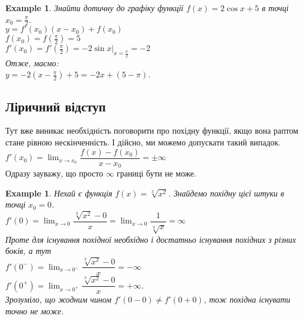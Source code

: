 \documentclass[a4paper, 14pt]{article}
\theoremstyle{theoremdd}
\theoremstyle{theoremdd}
\theoremstyle{theoremdd}
\theoremstyle{theoremdd}
\newtheorem{example}[theorem]{Example}
\theoremstyle{theoremdd}
\theoremstyle{theoremdd}
\theoremstyle{theoremdd}
\theoremstyle{theoremdd}
\begin{document}
\begin{example}
Знайти дотичну до графіку функції $f(x) = 2 \cos x + 5$ в точці $x_0 = \displaystyle \frac{\pi}{2}$.\\
$y = f'(x_0)(x-x_0)+f(x_0)$\\
$f(x_0) = \displaystyle f(\frac{\pi}{2}) = 5$\\
$f'(x_0) = \displaystyle f'(\frac{\pi}{2}) = -2 \sin x |_{x = \frac{\pi}{2}} = -2$\\
Отже, маємо:\\
$y = \displaystyle -2(x-\frac{\pi}{2}) + 5 = -2x + (5 - \pi)$.
\end{example}

\subsection*{Ліричний відступ}
Тут вже виникає необхідність поговорити про похідну функції, якщо вона раптом стане рівною нескінченність. І дійсно, ми можемо допускати такий випадок.\\
$f'(x_0) = \displaystyle \lim_{x \to x_0} \dfrac{f(x)-f(x_0)}{x-x_0} = \pm \infty$\\
Одразу зауважу, що просто $\infty$ границі бути не може.

\begin{example}
Нехай є функція $f(x) = \sqrt[3]{x^2}$. Знайдемо похідну цієї штуки в точці $x_0 = 0$.\\
$f'(0) = \displaystyle \lim_{x \to 0} \dfrac{\sqrt[3]{x^2} - 0}{x} = \lim_{x \to 0} \dfrac{1}{\sqrt[3]{x}} = \infty$\\
Проте для існування похідної необхідно і достатньо існування похідних з різних боків, а тут\\
$f'(0^-) = \displaystyle \lim_{x \to 0^-} \dfrac{\sqrt[3]{x^2} - 0}{x} = -\infty$\\
$f'(0^+) = \displaystyle \lim_{x \to 0^+} \dfrac{\sqrt[3]{x^2} - 0}{x} = +\infty$.\\
Зрозуміло, що жодним чином $f'(0-0) \neq f'(0+0)$, тож похідна існувати точно не може.
\\ \iffalse %
\begin{figure}[H]
\centering
{
\begin{tikzpicture}

\draw[thick, ->] (-3,0)--(3,0) node[anchor = north] {$x$};
\draw[thick, ->] (0,-0.5)--(0,2) node[anchor = east] {$y$};

\draw[red, domain=0.001:3, variable=\x, samples = 1000] plot({\x}, {((\x)^(2/3)}) node[anchor = north west] {$f(x) = \sqrt[3]{x^2}$};
\draw[red, domain=-3:-0.001, variable=\x, samples = 1000] plot({\x}, {((-\x)^(2/3)});
\end{tikzpicture}
}
\end{figure}
\fi %
\end{example}
\end{document}
